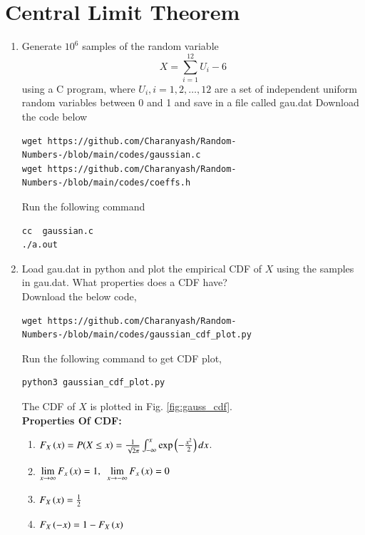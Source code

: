 \documentclass[journal,12pt,twocolumn]{IEEEtran}
\renewcommand\thesection{\arabic{section}}
\begin{document}
\section{Central Limit Theorem}
%
\begin{enumerate}[label=\thesection.\arabic*
,ref=\thesection.\theenumi]

%
\item
Generate $10^6$ samples of the random variable
%
\begin{equation}
X = \sum_{i=1}^{12}U_i -6
\end{equation}
%
using a C program, where $U_i, i = 1,2,\dots, 12$ are  a set of independent uniform random variables between 0 and 1
and save in a file called gau.dat
\solution Download the code below

\begin{lstlisting}
wget https://github.com/Charanyash/Random-Numbers-/blob/main/codes/gaussian.c
wget https://github.com/Charanyash/Random-Numbers-/blob/main/codes/coeffs.h
\end{lstlisting}
Run the following command
\begin{lstlisting}
cc  gaussian.c
./a.out
\end{lstlisting}
 
%
\item
Load gau.dat in python and plot the empirical CDF of $X$ using the samples in gau.dat. What properties does a CDF have?
\\
\solution Download the below code,
\begin{lstlisting}
wget https://github.com/Charanyash/Random-Numbers-/blob/main/codes/gaussian_cdf_plot.py
\end{lstlisting}
Run the following command to get CDF plot,
\begin{lstlisting}
python3 gaussian_cdf_plot.py
\end{lstlisting}
The CDF of $X$ is plotted in Fig. \ref{fig:gauss_cdf}.\\
\textbf{Properties Of CDF:}
 \begin{enumerate}
	 \item $ F_{X}\left(x\right) = P(X \leq x)= \frac{1}{\sqrt{2\pi}}\int_{-\infty}^{x}\exp\left(-\frac{x^2}{2}\right)dx$.
	 \item $ \lim \limits_{x\rightarrow \infty} F_{x}\left(x\right)=1, \hspace{5pt} \lim \limits_{x\rightarrow -\infty} F_{x}\left(x\right)=0$
	 \item $ F_{X}\left(x\right) = \frac{1}{2}$
	 \item $ F_{X}\left(-x\right) = 1 - F_{X}\left(x\right) $		 
 \end{enumerate}


\end{enumerate}
\end{document}

